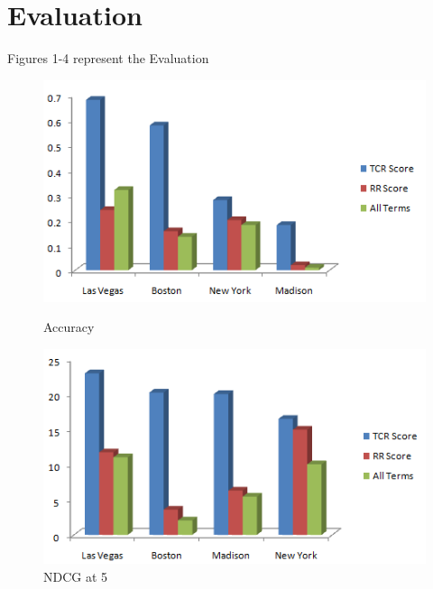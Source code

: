 \documentclass[paper=letter, fontsize=15pt]{article} %
\begin{document}
\section{Evaluation}
Figures 1-4 represent the Evaluation 

\begin{figure}[h!]
\begin{minipage}{.5\linewidth}
\centering
\includegraphics[scale=0.6]{Acc.png}
\caption{Accuracy}
\end{minipage}
\begin{minipage}{.5\linewidth}
\includegraphics[scale=0.6]{NDCG.png}
\caption{NDCG at 5}
\end{minipage}
\end{figure}
\end{document}

